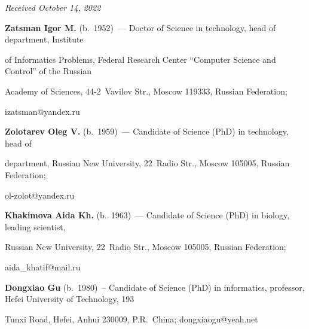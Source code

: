 \vspace*{-6pt}



\hfill{\small\textit{Received October 14, 2022}}



\Contr



\noindent

\textbf{Zatsman Igor M.} (b.\ 1952)~--- Doctor of Science in technology, head of department, Institute 

of Informatics Problems, Federal Research Center ``Computer Science and Control'' of the Russian 

Academy of Sciences, 44-2~Vavilov Str., Moscow 119333, Russian Federation; 

\mbox{izatsman@yandex.ru}



\vspace*{3pt}



\noindent

\textbf{Zolotarev Oleg V.} (b.\ 1959)~--- Candidate of Science (PhD) in technology, head of  

department, Russian New University, 22~Radio Str., Moscow 105005, Russian Federation;  

\mbox{ol-zolot@yandex.ru}



\vspace*{3pt}



\noindent

\textbf{Khakimova Aida Kh.} (b.\ 1963)~--- Candidate of Science (PhD) in biology, leading scientist, 

Russian New University, 22~Radio Str., Moscow 105005, Russian Federation; 

\mbox{aida\_khatif@mail.ru}



\vspace*{3pt}



\noindent

\textbf{Dongxiao Gu} (b.\ 1980)~-- Candidate of Science (PhD) in informatics, professor, Hefei University of Technology, 193 

Tunxi Road, Hefei, Anhui 230009, P.R.\ China; \mbox{dongxiaogu@yeah.net}



     

\label{end\stat}



\renewcommand{\bibname}{\protect\rm Литература}  


